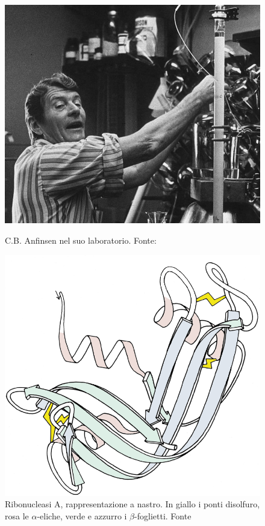 {{\begin{figure}[!htb]
	\centering
	\includegraphics[scale=0.25]{images/anfinsen.jpg}
	\caption{C.B. Anfinsen nel suo laboratorio. Fonte: \cite{anfinsenNIH}}
	\label{fig:anfinsen}
	\endminipage\hfill
	\centering
	\includegraphics[scale=0.2]{images/RibonucleaseA_SS_paleRib.png}
	\caption{Ribonucleasi A, rappresentazione a nastro. In giallo i ponti disolfuro, rosa le $\alpha$-eliche, verde e azzurro i $\beta$-foglietti. Fonte \cite{ribonucleasi-file}}
	\label{fig:ribonucleasi}
	\endminipage\hfill
\end{figure}

}}
